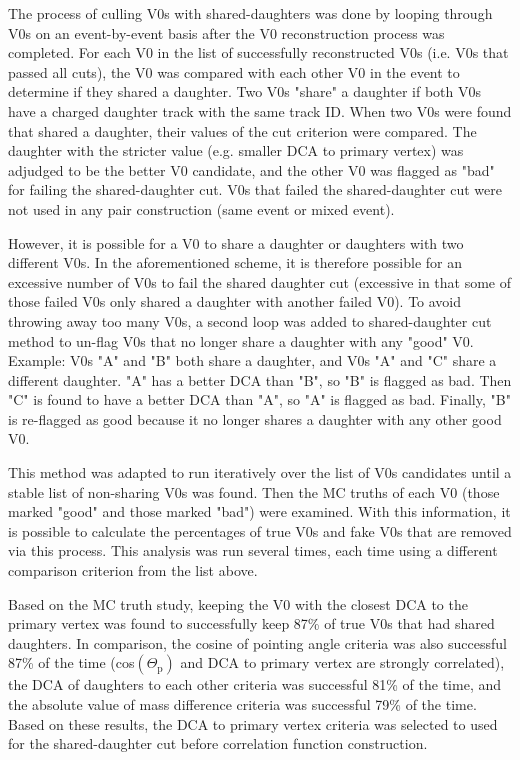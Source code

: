 The process of culling V0s with shared-daughters was done by looping through V0s on an event-by-event basis after the V0 reconstruction process was completed.  
For each V0 in the list of successfully reconstructed V0s (i.e. V0s that passed all cuts), the V0 was compared with each other V0 in the event to determine if they shared a daughter.  
Two V0s "share" a daughter if both V0s have a charged daughter track with the same track ID.  
When two V0s were found that shared a daughter, their values of the cut criterion were compared.  
The daughter with the stricter value (e.g. smaller DCA to primary vertex) was adjudged to be the better V0 candidate, and the other V0 was flagged as "bad" for failing the shared-daughter cut.  
V0s that failed the shared-daughter cut were not used in any pair construction (same event or mixed event).

However, it is possible for a V0 to share a daughter or daughters with two different V0s. 
In the aforementioned scheme, it is therefore possible for an excessive number of V0s to fail the shared daughter cut (excessive in that some of those failed V0s only shared a daughter with another failed V0).  
To avoid throwing away too many V0s, a second loop was added to shared-daughter cut method to un-flag V0s that no longer share a daughter with any "good" V0. 
Example: V0s "A" and "B" both share a daughter, and V0s "A" and "C" share a different daughter.  "A" has a better DCA than "B", so "B" is flagged as bad.  
Then "C" is found to have a better DCA than "A", so "A" is flagged as bad.  
Finally, "B" is re-flagged as good because it no longer shares a daughter with any other good V0.

This method was adapted to run iteratively over the list of V0s candidates until a stable list of non-sharing V0s was found.  
Then the MC truths of each V0 (those marked "good" and those marked "bad") were examined.  
With this information, it is possible to calculate the percentages of true V0s and fake V0s that are removed via this process.  
This analysis was run several times, each time using a different comparison criterion from the list above.

Based on the MC truth study, keeping the V0 with the closest DCA to the primary vertex was found to successfully keep 87\% of true V0s that had shared daughters.  
In comparison, the cosine of pointing angle criteria was also successful 87\% of the time (cos$(\Theta_\mathrm{p})$ and DCA to primary vertex are strongly correlated), the DCA of daughters to each other criteria was successful 81\% of the time, and the absolute value of mass difference criteria was successful 79\% of the time.
Based on these results, the DCA to primary vertex criteria was selected to used for the shared-daughter cut before correlation function construction.

